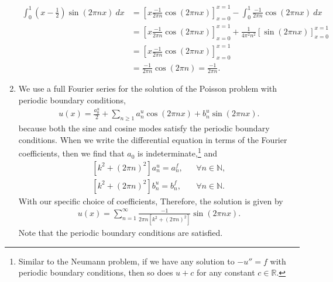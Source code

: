 \documentclass[11pt]{article}
\begin{document}
\begin{solution}
\begin{enumerate}
        \begin{align*}
            \int_{0}^{1} \left( x- \frac 1 2 \right) \sin(2 \pi n x) \ dx 
            &
            = 
            \left[ x \frac{-1}{2 \pi n} \cos(2 \pi n x) \right]_{x=0}^{x=1}
            -
            \int_{0}^{1} \frac{-1}{2 \pi n} \cos(2 \pi n x) \ dx
            \\&
            = 
            \left[ x \frac{-1}{2 \pi n} \cos(2 \pi n x) \right]_{x=0}^{x=1}
            +
            \frac{1}{ 4 \pi^{2} n^{2} } 
            \left[ \sin( 2 \pi n x ) \right]_{x=0}^{x=1}
            \\&
            = 
            \left[ x \frac{-1}{2 \pi n} \cos(2 \pi n x) \right]_{x=0}^{x=1}
            \\&
            = 
            \frac{-1}{2 \pi n} \cos(2 \pi n) 
            =
            \frac{-1}{2 \pi n} 
            .
        \end{align*}

        \item 
        We use a full Fourier series for the solution of the Poisson problem with periodic boundary conditions,
        \begin{align*}
            u(x) = \frac{a^{u}_0}{2} + \sum_{n \geq 1} a^{u}_{n} \cos( 2 \pi n x ) + b^{u}_{n} \sin( 2 \pi n x ).
        \end{align*}
        because both the sine and cosine modes satisfy the periodic boundary conditions. 
        When we write the differential equation in terms of the Fourier coefficients, then we find that $a_0$ is indeterminate,\footnote{Similar to the Neumann problem, if we have any solution to $-u'' = f$ with periodic boundary conditions, then so does $u+c$ for any constant $c \in \mathbb R$.} 
        and 
        \begin{align*}
            \left [k^2 + (2 \pi n)^2 \right] a^{u}_{n} = a^{f}_{n}, & & \forall n \in \mathbb{N}
            ,
            \\ 
            \left [k^2 + (2 \pi n)^2 \right] b^{u}_{n} = b^{f}_{n}, & & \forall n \in \mathbb{N}
            .
        \end{align*}
        With our specific choice of coefficients, 
        Therefore, the solution is given by
        \begin{align*}
            u(x) = \sum_{n=1}^{\infty} \frac{-1}{2\pi n \left[k^2 + (2 \pi n)^2 \right]} \sin(2 \pi n x).
        \end{align*}
        Note that the periodic boundary conditions are satisfied.
    \end{enumerate}
\end{solution}



% 
\end{document}
